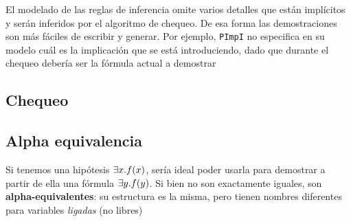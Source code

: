 El modelado de las reglas de inferencia omite varios detalles que están
implícitos y serán inferidos por el algoritmo de chequeo. De esa forma las
demostraciones son más fáciles de escribir y generar. Por ejemplo,
\texttt{PImpI} no especifica en su modelo cuál es la implicación que se está
introduciendo, dado que durante el chequeo debería ser la fórmula actual a demostrar

\subsection{Chequeo}


\subsection{Alpha equivalencia}

Si tenemos una hipótesis $\exists x . f(x)$, sería ideal poder usarla para demostrar a partir de ella una fórmula $\exists y . f(y)$. Si bien no son exactamente iguales, son \textbf{alpha-equivalentes}: su estructura es la misma, pero tienen nombres diferentes para variables \textit{ligadas} (no libres)

